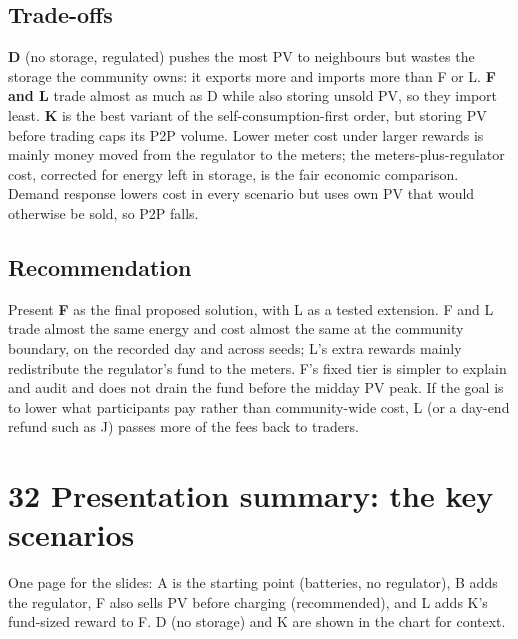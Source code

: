 \documentclass[a4paper,11pt]{article}
\begin{document}
\subsection*{Trade-offs}
\par\medskip

\textbf{D} (no storage, regulated) pushes the most PV to neighbours but wastes the storage the community owns: it exports more and imports more than F or L. \textbf{F and L} trade almost as much as D while also storing unsold PV, so they import least. \textbf{K} is the best variant of the self-consumption-first order, but storing PV before trading caps its P2P volume. Lower meter cost under larger rewards is mainly money moved from the regulator to the meters; the meters-plus-regulator cost, corrected for energy left in storage, is the fair economic comparison. Demand response lowers cost in every scenario but uses own PV that would otherwise be sold, so P2P falls.
\par\medskip

\subsection*{Recommendation}
\par\medskip

Present \textbf{F} as the final proposed solution, with L as a tested extension. F and L trade almost the same energy and cost almost the same at the community boundary, on the recorded day and across seeds; L's extra rewards mainly redistribute the regulator's fund to the meters. F's fixed tier is simpler to explain and audit and does not drain the fund before the midday PV peak. If the goal is to lower what participants pay rather than community-wide cost, L (or a day-end refund such as J) passes more of the fees back to traders.
\par\medskip

\clearpage

\section*{32  Presentation summary: the key scenarios}
\par\medskip

One page for the slides: A is the starting point (batteries, no regulator), B adds the regulator, F also sells PV before charging (recommended), and L adds K's fund-sized reward to F. D (no storage) and K are shown in the chart for context.
\par\medskip
\end{document}
